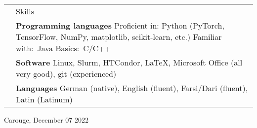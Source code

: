 \documentclass[11pt, a4paper]{article}
\newcommand{\headingfont}{\Large\color{OliveGreen}}
\newenvironment{SectionTable}[1]{
	\renewcommand*{\arraystretch}{1.7}
	\setlength{\tabcolsep}{10pt}
	\begin{longtable}{Rp{5.2in}} & #1 \\}
	{\end{longtable}\vspace{-.3cm}}
\begin{document}
    \begin{SectionTable}{\headingfont Skills}
		& \textbf{Programming languages} \newline
		Proficient in: Python \small (PyTorch, TensorFlow, NumPy, matplotlib, scikit-learn, etc.) \normalsize 
		\newline Familiar with:\ Java \newline  
		Basics:\ C/C++\\
		
		& \textbf{Software} \newline
		Linux, Slurm, HTCondor, \LaTeX, Microsoft Office (all very good), \newline git (experienced)\\
		
		& \textbf{Languages} \newline
		German (native), English (fluent), Farsi/Dari (fluent), Latin (Latinum)
	\end{SectionTable}
		
	\vspace{0.2cm}
	Carouge, December 07 2022
	
\end{document}
